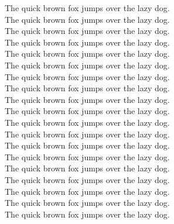 The quick brown fox jumps over the lazy dog.\\
The quick brown fox jumps over the lazy dog.\\
The quick brown fox jumps over the lazy dog.\\
The quick brown fox jumps over the lazy dog.\\
The quick brown fox jumps over the lazy dog.\\
The quick brown fox jumps over the lazy dog.\\
The quick brown fox jumps over the lazy dog.\\
The quick brown fox jumps over the lazy dog.\\
The quick brown fox jumps over the lazy dog.\\
The quick brown fox jumps over the lazy dog.\\
The quick brown fox jumps over the lazy dog.\\
The quick brown fox jumps over the lazy dog.\\
The quick brown fox jumps over the lazy dog.\\
The quick brown fox jumps over the lazy dog.\\
The quick brown fox jumps over the lazy dog.\\
The quick brown fox jumps over the lazy dog.\\
The quick brown fox jumps over the lazy dog.\\
The quick brown fox jumps over the lazy dog.\\
The quick brown fox jumps over the lazy dog.\\


%


